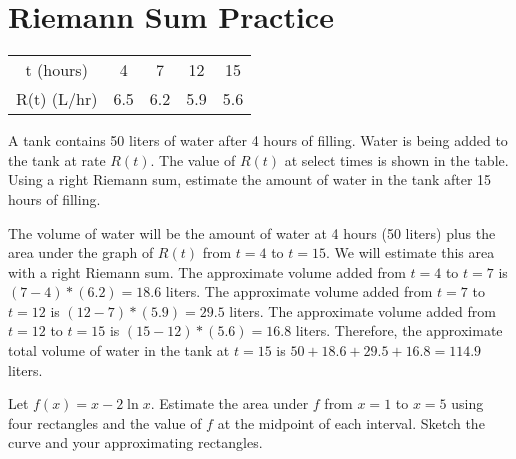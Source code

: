 \section{Riemann Sum Practice}

\begin{Exercise}[label=rsum2]
	\begin{center}
		\begin{tabular}{c|c|c|c|c}
			t (hours) & 4 & 7 & 12 & 15\\
			R(t) (L/hr) & 6.5 & 6.2 & 5.9 & 5.6\\
		\end{tabular}
	\end{center}
	A tank contains 50 liters of water after 4 hours of filling. Water is being added to the tank at rate $R(t)$. The value of $R(t)$ at select times is shown in the table. Using a right Riemann sum, estimate the amount of water in the tank after 15 hours of filling. 
\end{Exercise}

\begin{Answer}[ref=rsum2]
	The volume of water will be the amount of water at 4 hours (50 liters) plus the area under the graph of $R(t)$ from $t=4$ to $t=15$. We will estimate this area with a right Riemann sum. The approximate volume added from $t=4$ to $t=7$ is $(7-4)*(6.2) = 18.6$ liters. The approximate volume added from $t=7$ to $t=12$ is $(12-7)*(5.9)=29.5$ liters. The approximate volume added from $t=12$ to $t=15$ is $(15-12)*(5.6) = 16.8$ liters. Therefore, the approximate total volume of water in the tank at $t=15$ is $50 + 18.6 + 29.5 + 16.8 = 114.9$ liters. 
\end{Answer}

\begin{Exercise}[label=rsum3]
	Let $f(x) = x-2\ln{x}$. Estimate the area under $f$ from $x=1$ to $x=5$ using four rectangles and the value of $f$ at the midpoint of each interval. Sketch the curve and your approximating rectangles.
\end{Exercise}

